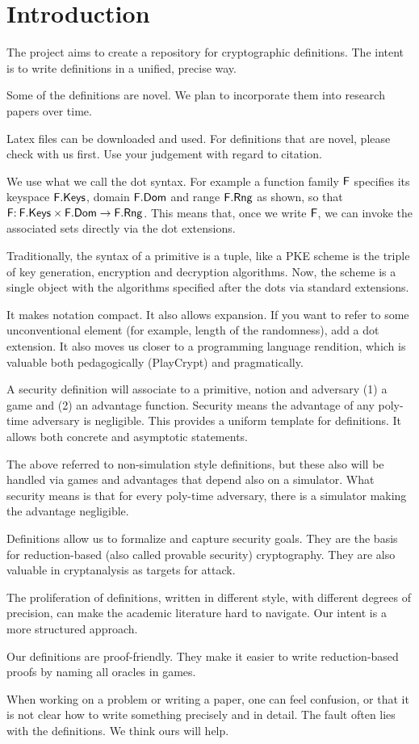 
\section{Introduction}\label{sec-intro}

The project aims to create a repository for cryptographic definitions. The intent is to write definitions in a unified, precise way. 

Some of the definitions are novel. We plan to incorporate them into research papers over time. 

Latex files can be downloaded and used. For definitions that are novel, please check with us first. Use your judgement with regard to citation.

 We use what we call the dot syntax. For example a function family $\mathsf{F}$ specifies its keyspace $\mathsf{F}.\mathsf{Keys}$, domain $\mathsf{F}.\mathsf{Dom}$ and range $\mathsf{F}.\mathsf{Rng}$ as shown, so that $\mathsf{F} {:\:} \mathsf{F}.\mathsf{Keys} \times \mathsf{F}.\mathsf{Dom}\to \mathsf{F}.\mathsf{Rng}$. This means that, once we write $\mathsf{F}$, we can invoke the associated sets directly via the dot extensions. 

Traditionally, the syntax of a primitive is a tuple, like a PKE scheme is the triple of key generation, encryption and decryption algorithms. Now, the scheme is a single object with the algorithms specified after the dots via standard extensions. 

It makes notation compact. It also allows expansion. If you want to refer to some unconventional element (for example, length of the randomness), add a dot extension. It also moves us closer to a programming language rendition, which is valuable both pedagogically (PlayCrypt) and pragmatically.

 A security definition will associate to a primitive, notion and adversary (1) a game and (2) an advantage function. Security means the advantage of any poly-time adversary is negligible. This provides a uniform template for definitions. It allows both concrete and asymptotic statements. 

The above referred to non-simulation style definitions, but these also will be handled via games and advantages that depend also on a simulator. What security means is that for every poly-time adversary, there is a simulator making the advantage negligible.


 Definitions allow us to formalize and capture security goals. They are the basis for reduction-based (also called provable security) cryptography. They are also valuable in cryptanalysis as targets for attack. 

The proliferation of definitions, written in different style, with different degrees of precision, can make the academic literature hard to navigate. Our intent is a more structured approach.

Our definitions are proof-friendly. They make it easier to write reduction-based proofs by naming all oracles in games.

When working on a problem or writing a paper, one can feel confusion, or that it is not clear how to write something precisely and in detail. The fault often lies with the definitions. We think ours will help.